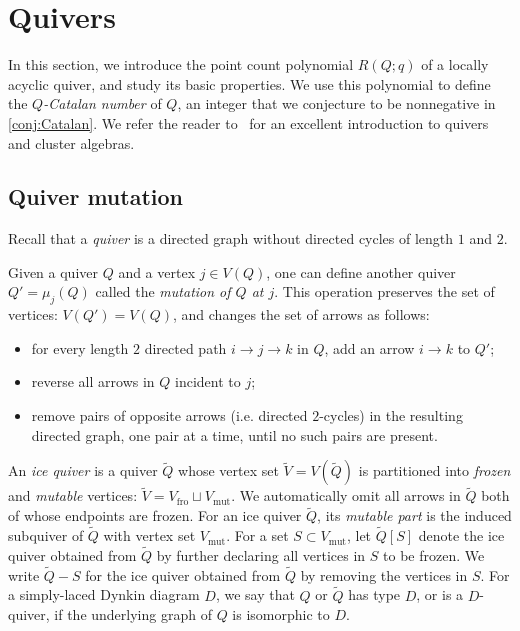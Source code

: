 \documentclass[11pt]{article}
\theoremstyle{definition}
\newcommand{\equalenv}[2]{\expandafter\let\csname#1\expandafter\endcsname\csname#2\endcsname\expandafter\let\csname end#1\expandafter\endcsname\csname end#2\endcsname}
\numberwithin{equation}{section}
\newcommand\Qice{\widetilde{Q}}
\newcommand\Vice{\widetilde{V}}
\newcommand\fro{\operatorname{fro}}
\newcommand\mut{\operatorname{mut}}
\newcommand\Vfro{V_{\fro}}
\newcommand\Vmut{V_{\mut}}
\def\Qicefr[#1]{\Qice[#1]}
\newcommand\Louise{locally acyclic\xspace}
\begin{document}


\setcounter{section}{4}
\section{Quivers}
In this section, we introduce the point count polynomial $R(Q;q)$ of a \Louise %
 quiver, and study its basic properties.  We use this polynomial to define the \emph{$Q$-Catalan number} of $Q$, an integer that we conjecture to be nonnegative in \cref{conj:Catalan}. We refer the reader to~\cite{FWZ_book} for an excellent introduction to quivers and cluster algebras.

\subsection{Quiver mutation}\label{sec:quiver}
Recall that a \emph{quiver} is a directed graph without directed cycles of length $1$ and $2$.

Given a quiver $Q$ and a vertex $j\in V(Q)$, one can define another quiver $Q'=\mu_j(Q)$ called the \emph{mutation of $Q$ at $j$}. This operation preserves the set of vertices:  $V(Q')=V(Q)$, and changes the set of arrows as follows:
\begin{itemize}
\item for every length $2$ directed path $i\to j\to k$ in $Q$, add an arrow $i\to k$ to $Q'$;
\item reverse all arrows in $Q$ incident to $j$;
\item remove pairs of opposite arrows (i.e.  directed $2$-cycles) in the resulting directed graph, one pair at a time, until no such pairs are present.
\end{itemize}

An \emph{ice quiver} is a quiver $\Qice$ whose vertex set $\Vice=V(\Qice)$ is partitioned into \emph{frozen} and \emph{mutable} vertices: $\Vice=\Vfro\sqcup \Vmut$. We automatically omit all arrows in $\Qice$ both of whose endpoints are frozen. For an ice quiver $\Qice$, its \emph{mutable part} is the induced subquiver of $\Qice$ with vertex set $\Vmut$.  %
 For a set $S\subset \Vmut$, let $\Qicefr[S]$ denote the ice quiver obtained from $\Qice$ by further declaring all vertices in $S$ to be frozen. We write $\Qice-S$ for the ice quiver obtained from $\Qice$ by removing the vertices in $S$.  For a simply-laced Dynkin diagram $D$, we say that $Q$ or $\Qice$ has type $D$, or is a $D$-quiver, if the underlying graph of $Q$ is isomorphic to $D$.
\end{document}
